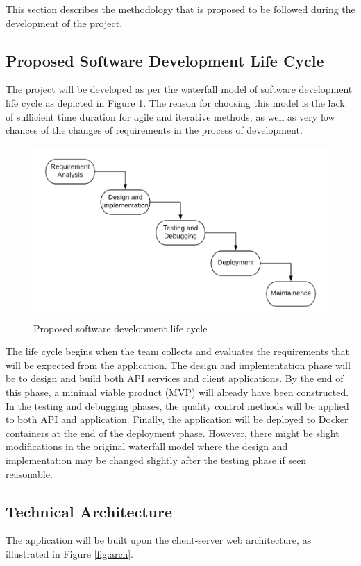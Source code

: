 This section describes the methodology that is proposed to be followed during the development of the project.

\subsection{Proposed Software Development Life Cycle}
The project will be developed as per the waterfall model of software development life cycle as depicted in Figure \ref{fig:sdlc}. The reason for choosing this model is the lack of sufficient time duration for agile and iterative methods, as well as very low chances of the changes of requirements in the process of development. 

\begin{figure}[h]
	\includegraphics[width=\linewidth]{figures/sdlc.png}
	\centering
	\caption{Proposed software development life cycle}
	\label{fig:sdlc}
\end{figure}

The life cycle begins when the team collects and evaluates the requirements that will be expected from the application. The design and implementation phase will be to design and build both API services and client applications. By the end of this phase, a minimal viable product (MVP) will already have been constructed. In the testing and debugging phases, the quality control methods will be applied to both API and application. Finally, the application will be deployed to Docker containers at the end of the deployment phase. However, there might be slight modifications in the original waterfall model where the design and implementation may be changed slightly after the testing phase if seen reasonable.

\subsection{Technical Architecture}
The application will be built upon the client-server web architecture, as illustrated in Figure \ref{fig:arch}.

